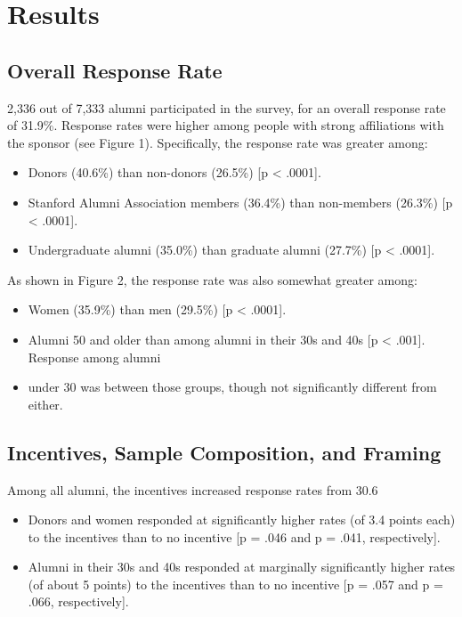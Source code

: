 \documentclass[12pt]{article}
\begin{document}
\section{Results}

\subsection{Overall Response Rate}

2,336 out of 7,333 alumni participated in the survey, for an overall response rate of 31.9\%.
Response rates were higher among people with strong affiliations with the sponsor (see Figure 1).  Specifically, the response rate was greater among:
\begin{itemize}
    \item Donors (40.6\%) than non-donors (26.5\%) [p < .0001].
    \item Stanford Alumni Association members (36.4\%) than non-members (26.3\%) [p < .0001].
    \item Undergraduate alumni (35.0\%) than graduate alumni (27.7\%) [p < .0001].
\end{itemize}

As shown in Figure 2, the response rate was also somewhat greater among:
\begin{itemize}
    \item Women (35.9\%) than men (29.5\%) [p < .0001].
    \item Alumni 50 and older than among alumni in their 30s and 40s [p < .001].  Response among alumni 
    \item under 30 was between those groups, though not significantly different from either.
\end{itemize}

\subsection{Incentives, Sample Composition, and Framing}

Among all alumni, the incentives increased response rates from 30.6%
\begin{itemize}
    \item Donors and women responded at significantly higher rates (of 3.4 points each) to the incentives than to no incentive [p = .046 and p = .041, respectively].  
    \item Alumni in their 30s and 40s responded at marginally significantly higher rates (of about 5 points) to the incentives than to no incentive [p = .057 and p = .066, respectively].
\end{itemize}
\end{document}
